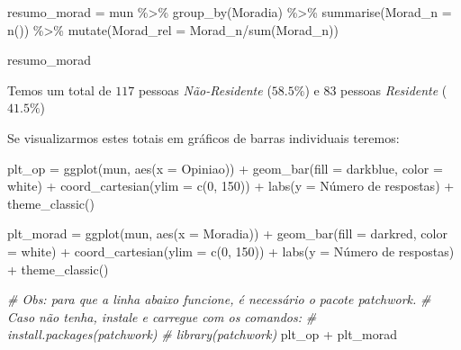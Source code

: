 \documentclass[
]{book}
\newenvironment{Shaded}{\begin{snugshade}}{\end{snugshade}}
\newcommand{\AttributeTok}[1]{\textcolor[rgb]{0.77,0.63,0.00}{#1}}
\newcommand{\CommentTok}[1]{\textcolor[rgb]{0.56,0.35,0.01}{\textit{#1}}}
\newcommand{\DecValTok}[1]{\textcolor[rgb]{0.00,0.00,0.81}{#1}}
\newcommand{\FunctionTok}[1]{\textcolor[rgb]{0.00,0.00,0.00}{#1}}
\newcommand{\NormalTok}[1]{#1}
\newcommand{\OtherTok}[1]{\textcolor[rgb]{0.56,0.35,0.01}{#1}}
\newcommand{\SpecialCharTok}[1]{\textcolor[rgb]{0.00,0.00,0.00}{#1}}
\newcommand{\StringTok}[1]{\textcolor[rgb]{0.31,0.60,0.02}{#1}}
\begin{document}
\begin{Shaded}
\begin{Highlighting}[]
\NormalTok{resumo\_morad }\OtherTok{=}\NormalTok{ mun }\SpecialCharTok{\%\textgreater{}\%} 
  \FunctionTok{group\_by}\NormalTok{(Moradia) }\SpecialCharTok{\%\textgreater{}\%} 
  \FunctionTok{summarise}\NormalTok{(}\AttributeTok{Morad\_n =} \FunctionTok{n}\NormalTok{()) }\SpecialCharTok{\%\textgreater{}\%} 
  \FunctionTok{mutate}\NormalTok{(}\AttributeTok{Morad\_rel =}\NormalTok{ Morad\_n}\SpecialCharTok{/}\FunctionTok{sum}\NormalTok{(Morad\_n))}

\NormalTok{resumo\_morad}
\end{Highlighting}
\end{Shaded}

Temos um total de \(117\) pessoas \emph{Não-Residente} (\(58.5\%\)) e \(83\) pessoas \emph{Residente} (\(41.5\%\))

Se visualizarmos estes totais em gráficos de barras individuais teremos:

\begin{Shaded}
\begin{Highlighting}[]
\NormalTok{plt\_op }\OtherTok{=} \FunctionTok{ggplot}\NormalTok{(mun, }\FunctionTok{aes}\NormalTok{(}\AttributeTok{x =}\NormalTok{ Opiniao)) }\SpecialCharTok{+}
  \FunctionTok{geom\_bar}\NormalTok{(}\AttributeTok{fill =} \StringTok{\textquotesingle{}darkblue\textquotesingle{}}\NormalTok{, }\AttributeTok{color =} \StringTok{\textquotesingle{}white\textquotesingle{}}\NormalTok{) }\SpecialCharTok{+}
  \FunctionTok{coord\_cartesian}\NormalTok{(}\AttributeTok{ylim =} \FunctionTok{c}\NormalTok{(}\DecValTok{0}\NormalTok{, }\DecValTok{150}\NormalTok{)) }\SpecialCharTok{+}
  \FunctionTok{labs}\NormalTok{(}\AttributeTok{y =} \StringTok{\textquotesingle{}Número de respostas\textquotesingle{}}\NormalTok{) }\SpecialCharTok{+}
  \FunctionTok{theme\_classic}\NormalTok{()}

\NormalTok{plt\_morad }\OtherTok{=} \FunctionTok{ggplot}\NormalTok{(mun, }\FunctionTok{aes}\NormalTok{(}\AttributeTok{x =}\NormalTok{ Moradia)) }\SpecialCharTok{+}
  \FunctionTok{geom\_bar}\NormalTok{(}\AttributeTok{fill =} \StringTok{\textquotesingle{}darkred\textquotesingle{}}\NormalTok{, }\AttributeTok{color =} \StringTok{\textquotesingle{}white\textquotesingle{}}\NormalTok{) }\SpecialCharTok{+}
  \FunctionTok{coord\_cartesian}\NormalTok{(}\AttributeTok{ylim =} \FunctionTok{c}\NormalTok{(}\DecValTok{0}\NormalTok{, }\DecValTok{150}\NormalTok{)) }\SpecialCharTok{+}
  \FunctionTok{labs}\NormalTok{(}\AttributeTok{y =} \StringTok{\textquotesingle{}Número de respostas\textquotesingle{}}\NormalTok{) }\SpecialCharTok{+}
  \FunctionTok{theme\_classic}\NormalTok{()}

\CommentTok{\# Obs: para que a linha abaixo funcione, é necessário o pacote \textquotesingle{}patchwork\textquotesingle{}. }
\CommentTok{\# Caso não tenha, instale e carregue com os comandos:}
\CommentTok{\# install.packages(\textquotesingle{}patchwork\textquotesingle{})}
\CommentTok{\# library(patchwork)}
\NormalTok{plt\_op }\SpecialCharTok{+}\NormalTok{ plt\_morad}
\end{Highlighting}
\end{Shaded}
\end{document}
